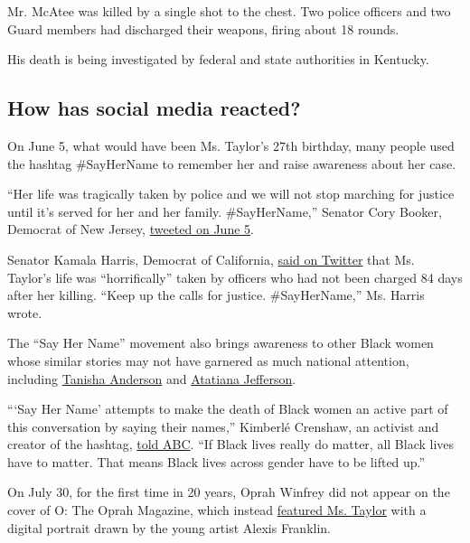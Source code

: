 Mr. McAtee was killed by a single shot to the chest. Two police officers
and two Guard members had discharged their weapons, firing about 18
rounds.

His death is being investigated by federal and state authorities in
Kentucky.

\hypertarget{how-has-social-media-reacted}{%
\subsection{How has social media
reacted?}\label{how-has-social-media-reacted}}

On June 5, what would have been Ms. Taylor's 27th birthday, many people
used the hashtag \#SayHerName to remember her and raise awareness about
her case.

``Her life was tragically taken by police and we will not stop marching
for justice until it's served for her and her family. \#SayHerName,''
Senator Cory Booker, Democrat of New Jersey,
\href{https://twitter.com/CoryBooker/status/1268961372836188163}{tweeted
on June 5}.

Senator Kamala Harris, Democrat of California,
\href{https://twitter.com/KamalaHarris/status/1268905322837692428}{said
on Twitter} that Ms. Taylor's life was ``horrifically'' taken by
officers who had not been charged 84 days after her killing. ``Keep up
the calls for justice. \#SayHerName,'' Ms. Harris wrote.

The ``Say Her Name'' movement also brings awareness to other Black women
whose similar stories may not have garnered as much national attention,
including
\href{https://www.nytimes.com/2015/05/25/us/71-arrested-in-cleveland-protests-over-officers-acquittal-police-say.html}{Tanisha
Anderson} and
\href{https://www.nytimes.com/2019/10/15/us/aaron-dean-atatiana-jefferson.html}{Atatiana
Jefferson}.

```Say Her Name' attempts to make the death of Black women an active
part of this conversation by saying their names,'' Kimberlé Crenshaw, an
activist and creator of the hashtag,
\href{https://twitter.com/GMA/status/1268881611011039234?ref_src=twsrc\%5Etfw\%7Ctwcamp\%5Etweetembed\%7Ctwterm\%5E1268881611011039234\&ref_url=https\%3A\%2F\%2Fpeople.com\%2Fcrime\%2Fbreonna-taylors-mom-mourns-daughter-on-what-wouldve-been-her-27th-birthday\%2F}{told
ABC}. ``If Black lives really do matter, all Black lives have to matter.
That means Black lives across gender have to be lifted up.''

On July 30, for the first time in 20 years, Oprah Winfrey did not appear
on the cover of O: The Oprah Magazine, which instead
\href{https://www.nytimes.com/2020/07/30/business/media/oprah-magazine-breonna-taylor-cover.html}{featured
Ms. Taylor} with a digital portrait drawn by the young artist Alexis
Franklin.

